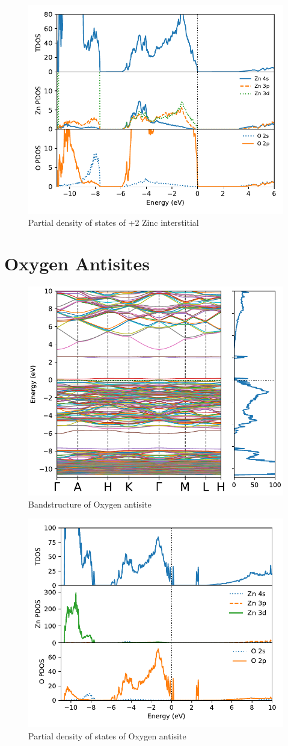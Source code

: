 \begin{figure}[tbh!]
	\centering
	\includegraphics[width=0.6\linewidth]{"images/rnd/dos-pdos_Zn_i-p2"}
	\caption[Partial density of states of +2 Zinc interstitial]{Partial density of states of +2 Zinc interstitial }
\end{figure}


\clearpage

\section{Oxygen Antisites}

\begin{figure}[tbh!]
	\centering
	\includegraphics[width=0.6\linewidth]{"images/rnd/band-dos_O_anti"}
	\caption[Bandstructure of Oxygen antisite]{Bandstructure of Oxygen antisite}
\end{figure}

\begin{figure}[tbh!]
	\centering
	\includegraphics[width=0.6\linewidth]{"images/rnd/dos-pdos_O_anti"}
	\caption[Partial density of states of Oxygen antisite]{Partial density of states of Oxygen antisite}
\end{figure}

